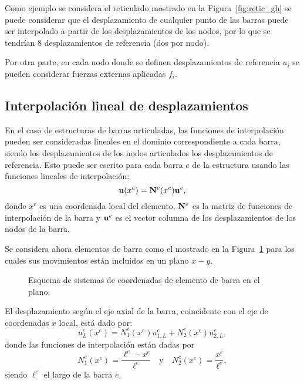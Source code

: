Como ejemplo se considera el reticulado mostrado en la Figura~\ref{fig:retic_gh} se puede considerar que el desplazamiento de cualquier punto de las barras puede ser interpolado a partir de los desplazamientos de los nodos, por lo que se tendrían $8$ desplazamientos de referencia (dos por nodo).

Por otra parte, en cada nodo donde se definen desplazamientos de referencia $u_i$ se pueden considerar fuerzas externas aplicadas $f_i$.

\subsection{Interpolación lineal de desplazamientos}

En el caso de estructuras de barras articuladas, las funciones de interpolación pueden ser consideradas lineales en el dominio correspondiente a cada barra, siendo los desplazamientos de los nodos articulados los desplazamientos de referencia. %
%
Esto puede ser escrito para cada barra $e$ de la estructura usando las funciones lineales de interpolación:
%
\begin{equation}
{\bf u} (x^e) = {\bf N}^e(x^e) {\bf u}^e,
\end{equation}
%
donde $x^e$ es una coordenada local del elemento, ${\bf N}^e$ es la matriz de funciones de interpolación de la barra y ${\bf u}^e$ es el vector columna de los desplazamientos de los nodos de la barra. %
%


Se considera ahora elementos de barra como el mostrado en la Figura~\ref{fig:eleplabar} para los cuales sus movimientos están incluidos en un plano $x-y$. %
%
\begin{figure}[htb]
	\centering
  \def\svgwidth{0.7\textwidth}
  
	\caption{Esquema de sistemas de coordenadas de elemento de barra en el plano.}
	\label{fig:eleplabar}
\end{figure}

El desplazamiento según el eje axial de la barra, coincidente con el eje de coordenadas $x$ local, está dado por:
%
\begin{equation}
u_L^e(x^e) = N_1^e(x^e) u_{1,L}^e  + N_2^e(x^e) u_{2,L}^e,
\end{equation}
%
donde las funciones de interpolación están dadas por
%
\begin{equation}
N_1^e(x^e) = \frac{\ell^e - x^e}{\ell^e}
\quad \text{y} \quad N_2^e(x^e) = \frac{x^e}{\ell^e},
\end{equation}
%
siendo $\ell^e$ el largo de la barra $e$.


